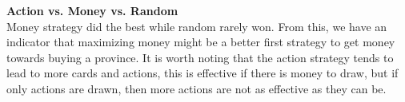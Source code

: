 \documentclass[11pt, oneside]{article}   	%
\begin{document}
\textbf{Action vs. Money vs. Random} \\

Money strategy did the best while random rarely won. From this, we have an indicator that maximizing money might be a better first strategy to get money towards buying a province. It is worth noting that the action strategy tends to lead to more cards and actions, this is effective if there is money to draw, but if only actions are drawn, then more actions are not as effective as they can be. 

\begin{figure}[H] \centering
   \begin{minipage}{0.49\textwidth}
   \end{minipage}
   \begin {minipage}{0.49\textwidth}

\end{minipage}
\end{figure}
\end{document}
